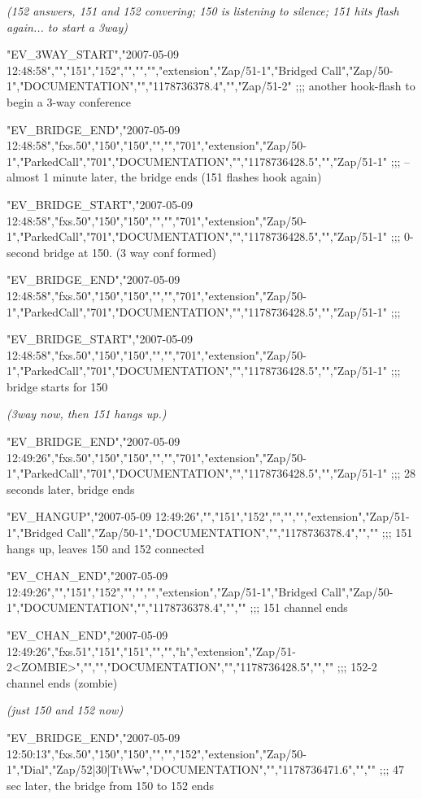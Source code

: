 \begin{astlisting}
{\it (152 answers, 151 and 152 convering; 150 is listening to silence; 151 hits flash again... to start a 3way)}

"EV\_3WAY\_START","2007-05-09 12:48:58","","151","152","","","","extension","Zap/51-1","Bridged Call","Zap/50-1","DOCUMENTATION","","1178736378.4","","Zap/51-2"           ;;; another hook-flash to begin a 3-way conference

"EV\_BRIDGE\_END","2007-05-09 12:48:58","fxs.50","150","150","","","701","extension","Zap/50-1","ParkedCall","701","DOCUMENTATION","","1178736428.5","","Zap/51-1"         ;;; -- almost 1 minute later, the bridge ends (151 flashes hook again)

"EV\_BRIDGE\_START","2007-05-09 12:48:58","fxs.50","150","150","","","701","extension","Zap/50-1","ParkedCall","701","DOCUMENTATION","","1178736428.5","","Zap/51-1"       ;;; 0-second bridge at 150. (3 way conf formed)

"EV\_BRIDGE\_END","2007-05-09 12:48:58","fxs.50","150","150","","","701","extension","Zap/50-1","ParkedCall","701","DOCUMENTATION","","1178736428.5","","Zap/51-1"         ;;;

"EV\_BRIDGE\_START","2007-05-09 12:48:58","fxs.50","150","150","","","701","extension","Zap/50-1","ParkedCall","701","DOCUMENTATION","","1178736428.5","","Zap/51-1"       ;;; bridge starts for 150

{\it (3way now, then 151 hangs up.)}

"EV\_BRIDGE\_END","2007-05-09 12:49:26","fxs.50","150","150","","","701","extension","Zap/50-1","ParkedCall","701","DOCUMENTATION","","1178736428.5","","Zap/51-1"         ;;; 28 seconds later, bridge ends

"EV\_HANGUP","2007-05-09 12:49:26","","151","152","","","","extension","Zap/51-1","Bridged Call","Zap/50-1","DOCUMENTATION","","1178736378.4","",""                       ;;; 151 hangs up, leaves 150 and 152 connected

"EV\_CHAN\_END","2007-05-09 12:49:26","","151","152","","","","extension","Zap/51-1","Bridged Call","Zap/50-1","DOCUMENTATION","","1178736378.4","",""                     ;;; 151 channel ends

"EV\_CHAN\_END","2007-05-09 12:49:26","fxs.51","151","151","","","h","extension","Zap/51-2<ZOMBIE>","","","DOCUMENTATION","","1178736428.5","",""                          ;;; 152-2 channel ends (zombie)

{\it (just 150 and 152 now)}

"EV\_BRIDGE\_END","2007-05-09 12:50:13","fxs.50","150","150","","","152","extension","Zap/50-1","Dial","Zap/52|30|TtWw","DOCUMENTATION","","1178736471.6","",""            ;;; 47 sec later, the bridge from 150 to 152 ends


\end{astlisting}
